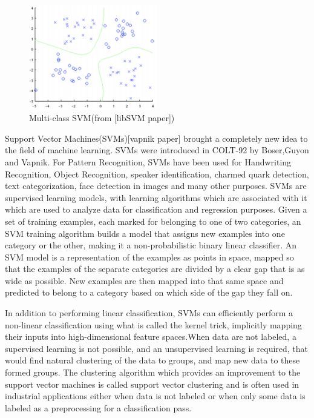 \begin{figure}[b]
	\begin{center}
		\includegraphics[width=0.5\textwidth]{Figures/Figure10}
	\end{center}
	\caption{Multi-class SVM(from [libSVM paper])}
	\label{fig:Figure10}
\end{figure}

Support Vector Machines(SVMs)[vapnik paper] brought a completely new idea to the field of machine learning. SVMs were introduced in COLT-92 by Boser,Guyon and Vapnik. For Pattern Recognition, SVMs have been used for Handwriting Recognition, Object Recognition, speaker identification, charmed quark detection, text categorization, face detection in images and many other purposes. SVMs are supervised learning models, with learning algorithms which are associated with it which are used to analyze data for classification and regression purposes. Given a set of training examples, each marked for belonging to one of two categories, an SVM training algorithm builds a model that assigns new examples into one category or the other, making it a non-probabilistic binary linear classifier. An SVM model is a representation of the examples as points in space, mapped so that the examples of the separate categories are divided by a clear gap that is as wide as possible. New examples are then mapped into that same space and predicted to belong to a category based on which side of the gap they fall on.

In addition to performing linear classification, SVMs can efficiently perform a non-linear classification using what is called the kernel trick, implicitly mapping their inputs into high-dimensional feature spaces.When data are not labeled, a supervised learning is not possible, and an unsupervised learning is required, that would find natural clustering of the data to groups, and map new data to these formed groups. The clustering algorithm which provides an improvement to the support vector machines is called support vector clustering and is often used in industrial applications either when data is not labeled or when only some data is labeled as a preprocessing for a classification pass.

